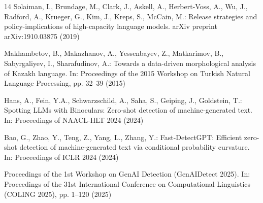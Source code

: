 \documentclass[runningheads]{llncs}
\begin{document}
\begin{thebibliography}{14}
Solaiman, I., Brundage, M., Clark, J., Askell, A., Herbert-Voss, A., Wu, J., Radford, A., Krueger, G., Kim, J., Kreps, S., McCain, M.: Release strategies and policy-implications of high-capacity language models. arXiv preprint arXiv:1910.03875 (2019)

Makhambetov, B., Makazhanov, A., Yessenbayev, Z., Matkarimov, B., Sabyrgaliyev, I., Sharafudinov, A.: Towards a data-driven morphological analysis of Kazakh language. In: Proceedings of the 2015 Workshop on Turkish Natural Language Processing, pp. 32--39 (2015)

Hans, A., Fein, Y.A., Schwarzschild, A., Saha, S., Geiping, J., Goldstein, T.: Spotting LLMs with Binoculars: Zero-shot detection of machine-generated text. In: Proceedings of NAACL-HLT 2024 (2024)

Bao, G., Zhao, Y., Teng, Z., Yang, L., Zhang, Y.: Fast-DetectGPT: Efficient zero-shot detection of machine-generated text via conditional probability curvature. In: Proceedings of ICLR 2024 (2024)

Proceedings of the 1st Workshop on GenAI Detection (GenAIDetect 2025). In: Proceedings of the 31st International Conference on Computational Linguistics (COLING 2025), pp. 1--120 (2025)

\end{thebibliography}
\end{document}
